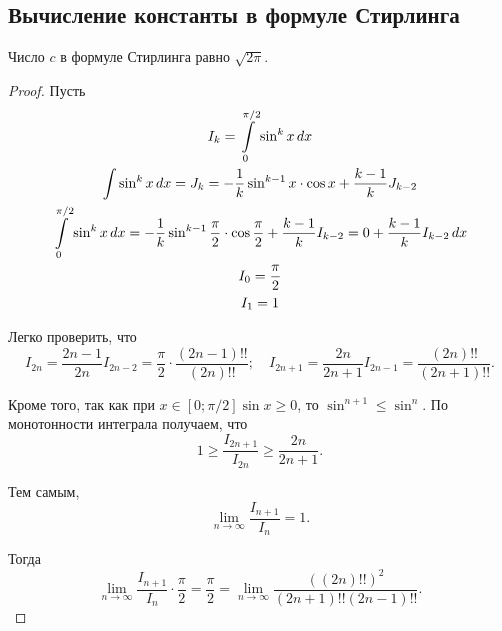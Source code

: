 \documentclass[a4paper]{article}
\theoremstyle{named}
\renewcommand{\int}{\intop}
\begin{document}
   		\subsection{Вычисление константы в формуле Стирлинга}

   		\begin{theorem*}
   			Число $c$ в формуле Стирлинга равно $\sqrt{2\pi}$.
   		\end{theorem*}

   		\begin{proof}
   			Пусть
   			\[\begin{gathered}
                I_k = \int_0^{\pi/2} \sin^k x \dd x \\
                \int \sin^k x \dd x = J_k = -\dfrac{1}{k} \sin^{k - 1} x \cdot \cos x + \dfrac{k - 1}{k} J_{k - 2} \\
                \int_0^{\pi/2} \sin^k x \dd x = -\dfrac{1}{k} \sin^{k - 1} \dfrac{\pi}{2} \cdot \cos \dfrac{\pi}{2} + \dfrac{k - 1}{k} I_{k - 2} = 0 + \dfrac{k - 1}{k} I_{k - 2} \dd x \\
                I_0 = \dfrac{\pi}{2} \\
                I_1 = 1 \\
            \end{gathered}\]

   			Легко проверить, что
   			\begin{equation*}
   				I_{2n} = \dfrac{2n - 1}{2n}I_{2n - 2} = \dfrac{\pi}{2} \cdot \dfrac{(2n - 1)!!}{(2n)!!};
   				\quad
   				I_{2n + 1} = \dfrac{2n}{2n + 1}I_{2n - 1} = \dfrac{(2n)!!}{(2n + 1)!!}.
   			\end{equation*}

   			Кроме того, так как при $x \in [0; \pi/2] \sin x \geq 0$, то $\sin^{n + 1} \leq \sin^{n}$. По монотонности интеграла получаем, что
   			\begin{equation*}
   				1 \geq \dfrac{I_{2n + 1}}{I_{2n}} \geq \dfrac{2n}{2n + 1}.
   			\end{equation*}

   			Тем самым,
   			\begin{equation*}
   				\lim_{n \to \infty} \dfrac{I_{n + 1}}{I_n} = 1.
   			\end{equation*}

            Тогда
            \begin{equation*}
                \lim_{n \to \infty} \dfrac{I_{n + 1}}{I_n} \cdot \frac{\pi}{2} = \dfrac{\pi}{2} = \lim_{n \to \infty} \dfrac{((2n)!!)^2}{(2n + 1)!!(2n - 1)!!}.
            \end{equation*}


\end{proof}
\end{document}

